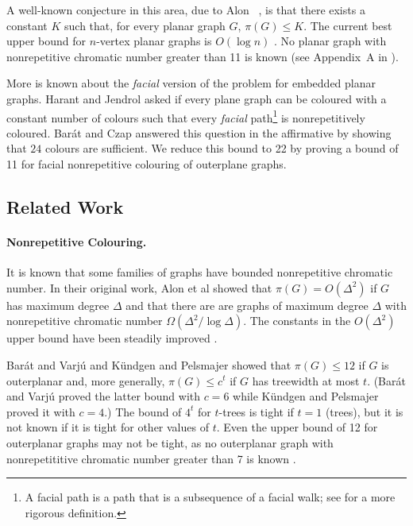 \documentclass{patmorin}
\begin{document}
A well-known conjecture in this area, due to Alon \etal\
\cite{alon2002nonrepetitive}, is that there exists a constant
$K$ such that, for every planar graph $G$, $\pi(G) \leq K$.
The current best upper bound for $n$-vertex planar graphs is
$O(\log n)$ \cite{dujmovic2012planarlogn}. No planar graph
with nonrepetitive chromatic number greater than 11 is known
(see Appendix~A in \cite{dujmovic2012planarlogn}).

More is known about the \emph{facial} version of the problem for embedded
planar graphs.  Harant and Jendrol \cite{harant2012nonrepetitive} asked
if every plane graph can be coloured with a constant number of colours
such that every \emph{facial} path\footnote{A facial path is a path
that is a subsequence of a facial walk; see \secref{preliminaries} for a
more rigorous definition.}
is nonrepetitively coloured.  Barát and Czap \cite{barat2013facial}
answered this question in the affirmative by showing that $24$ colours
are sufficient.  We reduce this bound to 22 by proving a bound of 11
for facial nonrepetitive colouring of outerplane graphs.

\subsection{Related Work}

\paragraph{Nonrepetitive Colouring.}

It is known that some families of graphs have bounded
nonrepetitive chromatic number.  In their original work,
Alon et al \cite{alon2002nonrepetitive} showed that $\pi(G) =
O(\Delta^2)$ if $G$ has maximum degree $\Delta$ and that there
are are graphs of maximum degree $\Delta$ with nonrepetitive
chromatic number $\Omega(\Delta^2/\log \Delta)$.  The constants
in the $O(\Delta^2)$ upper bound have been steadily improved
\cite{dujmovic2011nonrepetitive,grytczuk2007nonrepetitivesurvey,grytczuk2007nonrepetitive,harant2012nonrepetitive}.

Barát and Varjú \cite{barat2007square} and K{\"u}ndgen and Pelsmajer
\cite{kundgen2008nonrepetitive} showed that $\pi(G)\le 12$ if $G$ is
outerplanar and, more generally, $\pi(G)\le c^t$ if $G$ has treewidth at
most $t$.  (Barát and Varjú proved the latter bound with $c=6$ while
K{\"u}ndgen and Pelsmajer proved it with $c=4$.)  The bound of $4^t$
for $t$-trees is tight if $t=1$ (trees), but it is not known if it is
tight for other values of $t$. Even the upper bound of 12 for outerplanar
graphs may not be tight, as no outerplanar graph with nonrepetititive
chromatic number greater than 7 is known \cite{barat2007square}.
\end{document}
